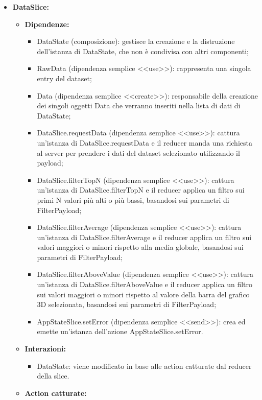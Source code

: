 \begin{itemize}
    \item \textbf{DataSlice:}
    \begin{itemize}
        \item \textbf{Dipendenze:}
        \begin{itemize}
            \item DataState (composizione): gestisce la creazione e la distruzione dell'istanza di DataState, che non è condivisa con altri componenti;
            \item RawData (dipendenza semplice <<use>>): rappresenta una singola entry del dataset;
            \item Data (dipendenza semplice <<create>>): responsabile della creazione dei singoli oggetti Data che verranno inseriti nella lista di dati di DataState;
            \item DataSlice.requestData (dipendenza semplice <<use>>): cattura un'istanza di DataSlice.requestData e il reducer manda una richiesta al server per prendere i dati del dataset selezionato utilizzando il payload;
            \item DataSlice.filterTopN (dipendenza semplice <<use>>): cattura un'istanza di DataSlice.filterTopN e il reducer applica un filtro sui primi N valori più alti o più bassi, basandosi sui parametri di FilterPayload;
            \item DataSlice.filterAverage (dipendenza semplice <<use>>): cattura un’istanza di DataSlice.filterAverage e il reducer applica un filtro sui valori maggiori o minori rispetto alla media globale, basandosi sui parametri di FilterPayload;
            \item DataSlice.filterAboveValue (dipendenza semplice <<use>>): cattura un’istanza di DataSlice.filterAboveValue e il reducer applica un filtro sui valori maggiori o minori rispetto al valore della barra del grafico 3D selezionata, basandosi sui parametri di FilterPayload;
            \item AppStateSlice.setError (dipendenza semplice <<send>>): crea ed emette un’istanza dell’azione AppStateSlice.setError.
        \end{itemize} 
        \item \textbf{Interazioni:}
        \begin{itemize}
            \item DataState: viene modificato in base alle action catturate dal reducer della slice.
        \end{itemize} 
        \item \textbf{Action catturate:}

\end{itemize}
\end{itemize}
